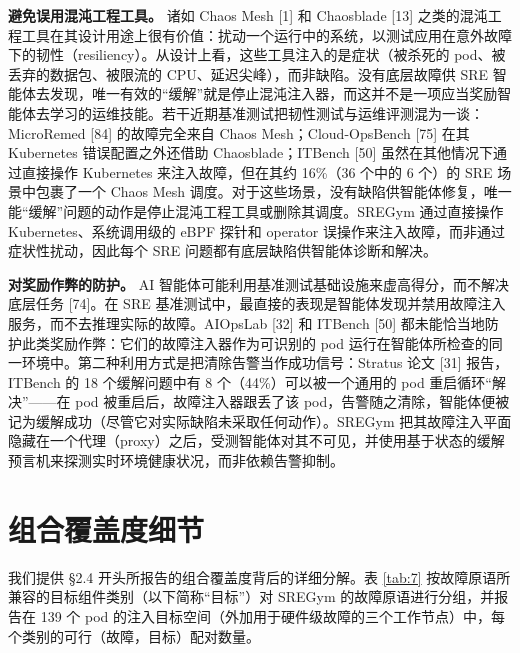 \documentclass[11pt,UTF8,fontset=fandol]{ctexart}
\begin{document}
\textbf{避免误用混沌工程工具。} 诸如 Chaos Mesh [1] 和 Chaosblade [13] 之类的混沌工程工具在其设计用途上很有价值：扰动一个运行中的系统，以测试应用在意外故障下的韧性（resiliency）。从设计上看，这些工具注入的是症状（被杀死的 pod、被丢弃的数据包、被限流的 CPU、延迟尖峰），而非缺陷。没有底层故障供 SRE 智能体去发现，唯一有效的“缓解”就是停止混沌注入器，而这并不是一项应当奖励智能体去学习的运维技能。若干近期基准测试把韧性测试与运维评测混为一谈：MicroRemed [84] 的故障完全来自 Chaos Mesh；Cloud-OpsBench [75] 在其 Kubernetes 错误配置之外还借助 Chaosblade；ITBench [50] 虽然在其他情况下通过直接操作 Kubernetes 来注入故障，但在其约 16\%（36 个中的 6 个）的 SRE 场景中包裹了一个 Chaos Mesh 调度。对于这些场景，没有缺陷供智能体修复，唯一能“缓解”问题的动作是停止混沌工程工具或删除其调度。SREGym 通过直接操作 Kubernetes、系统调用级的 eBPF 探针和 operator 误操作来注入故障，而非通过症状性扰动，因此每个 SRE 问题都有底层缺陷供智能体诊断和解决。

\textbf{对奖励作弊的防护。} AI 智能体可能利用基准测试基础设施来虚高得分，而不解决底层任务 [74]。在 SRE 基准测试中，最直接的表现是智能体发现并禁用故障注入服务，而不去推理实际的故障。AIOpsLab [32] 和 ITBench [50] 都未能恰当地防护此类奖励作弊：它们的故障注入器作为可识别的 pod 运行在智能体所检查的同一环境中。第二种利用方式是把清除告警当作成功信号：Stratus 论文 [31] 报告，ITBench 的 18 个缓解问题中有 8 个（44\%）可以被一个通用的 pod 重启循环“解决”——在 pod 被重启后，故障注入器跟丢了该 pod，告警随之清除，智能体便被记为缓解成功（尽管它对实际缺陷未采取任何动作）。SREGym 把其故障注入平面隐藏在一个代理（proxy）之后，受测智能体对其不可见，并使用基于状态的缓解预言机来探测实时环境健康状况，而非依赖告警抑制。

\section{组合覆盖度细节}

我们提供 §2.4 开头所报告的组合覆盖度背后的详细分解。表 \ref{tab:7} 按故障原语所兼容的目标组件类别（以下简称“目标”）对 SREGym 的故障原语进行分组，并报告在 139 个 pod 的注入目标空间（外加用于硬件级故障的三个工作节点）中，每个类别的可行（故障，目标）配对数量。
\end{document}
